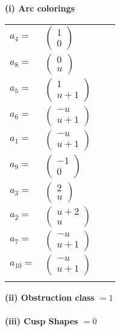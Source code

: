 \documentclass[1p]{elsarticle_modified}
\theoremstyle{definition}
\begin{document}
\flushleft \textbf{(i) Arc colorings}\\
\begin{tabular}{m{7pt} m{180pt} m{7pt} m{180pt} }
\flushright $a_{4}=$&$\begin{pmatrix}1\\0\end{pmatrix}$ \\
\flushright $a_{8}=$&$\begin{pmatrix}0\\u\end{pmatrix}$ \\
\flushright $a_{5}=$&$\begin{pmatrix}1\\u+1\end{pmatrix}$ \\
\flushright $a_{6}=$&$\begin{pmatrix}- u\\u+1\end{pmatrix}$ \\
\flushright $a_{1}=$&$\begin{pmatrix}- u\\u+1\end{pmatrix}$ \\
\flushright $a_{9}=$&$\begin{pmatrix}-1\\0\end{pmatrix}$ \\
\flushright $a_{3}=$&$\begin{pmatrix}2\\u\end{pmatrix}$ \\
\flushright $a_{2}=$&$\begin{pmatrix}u+2\\u\end{pmatrix}$ \\
\flushright $a_{7}=$&$\begin{pmatrix}- u\\u+1\end{pmatrix}$ \\
\flushright $a_{10}=$&$\begin{pmatrix}- u\\u+1\end{pmatrix}$\\&\end{tabular}
\flushleft \textbf{(ii) Obstruction class $= 1$}\\~\\
\flushleft \textbf{(iii) Cusp Shapes $= 0$}\\~\\
\end{document}
